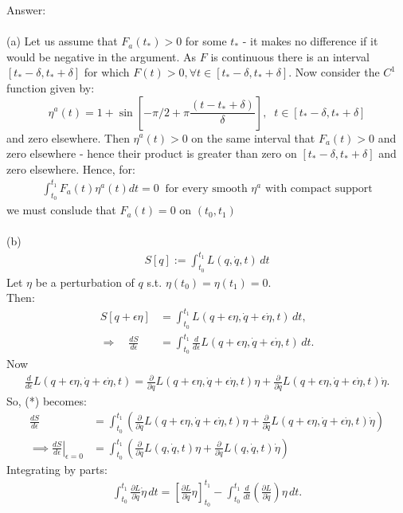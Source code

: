 \documentclass[12pt]{article}
\begin{document}
\newpage
\noindent
Answer: \\
\\
(a) Let us assume that $F_a(t_*) > 0$ for some $t_*$ - it makes no difference if it would be negative in the argument.
As $F$ is continuous there is an interval $[t_* - \delta, t_* + \delta]$ for which $F(t) > 0, \forall t \in [t_* - \delta, t_* + \delta]$.
Now consider the $C^1$ function given by:
$$ \eta^a(t) = 1 + \sin\left[-\pi/2 + \pi \frac{(t - t_* + \delta)}{\delta}\right], \;\; t \in [t_* - \delta, t_* + \delta]$$
and zero elsewhere.  Then $\eta^a(t) > 0$ on the same interval that $F_a(t)>0$ and zero elsewhere - hence their product is greater than zero on $[t_* - \delta, t_* + \delta]$ and 
zero elsewhere.  Hence, for:
\begin{align*}
\int_{t_0}^{t_1} F_a(t) \eta^a(t) dt = 0 \;\; \text{for every smooth $\eta^a$ with compact support}
\end{align*}
we must conslude that $F_a(t) = 0$ on $(t_0, t_1)$\\
\\
(b)\\
\begin{align*}
S[q] := \int_{t_0}^{t_1} L(q,\dot q,t)\,dt
\end{align*}
Let $\eta$ be a perturbation of $q$ s.t. $\eta(t_0)=\eta(t_1)=0$. \\
Then:
\begin{align*}
S[q+\epsilon\eta]
  &= \int_{t_0}^{t_1}
     L(q+\epsilon\eta,\dot q+\epsilon\dot\eta,t)\,dt,\\
\Rightarrow\quad
\frac{dS}{d\epsilon}
  &= \int_{t_0}^{t_1}
     \frac{d}{d\epsilon}
     L(q+\epsilon\eta,\dot q+\epsilon\dot\eta,t)\,dt.
     \tag{*}
\end{align*}
Now
\begin{align*}
\frac{d}{d\epsilon}
L(q+\epsilon\eta,\dot q+\epsilon\dot\eta,t)
=
\frac{\partial}{\partial q}L(q+\epsilon\eta,\dot q+\epsilon\dot\eta,t) \eta
+
\frac{\partial}{\partial\dot q}L(q+\epsilon\eta,\dot q+\epsilon\dot\eta,t) \dot\eta.
\end{align*}
So, (*) becomes:
\begin{align*}
\frac{dS}{d\epsilon}
&=
\int_{t_0}^{t_1}
\left(\frac{\partial}{\partial q}L(q+\epsilon\eta,\dot q+\epsilon\dot\eta,t) \eta
+
\frac{\partial}{\partial\dot q}
L(q+\epsilon\eta,\dot q+\epsilon\dot\eta,t)\dot\eta
\right) \\
\implies \left. \frac{dS}{d\epsilon} \right|_{\epsilon=0} &=
\int_{t_0}^{t_1}
\left(\frac{\partial}{\partial q}L(q,\dot q,t) \eta
+
\frac{\partial}{\partial\dot q}
L(q,\dot q,t)\dot\eta
\right)
\tag{**}
\end{align*}
Integrating by parts:
\begin{align*}
\int_{t_0}^{t_1}
\frac{\partial L}{\partial\dot q}\dot\eta\,dt
=
\left[
\frac{\partial L}{\partial\dot q}\eta
\right]_{t_0}^{t_1}
-
\int_{t_0}^{t_1}
\frac{d}{dt}
\left(\frac{\partial L}{\partial\dot q}\right)\eta\,dt.
\end{align*}
\end{document}
